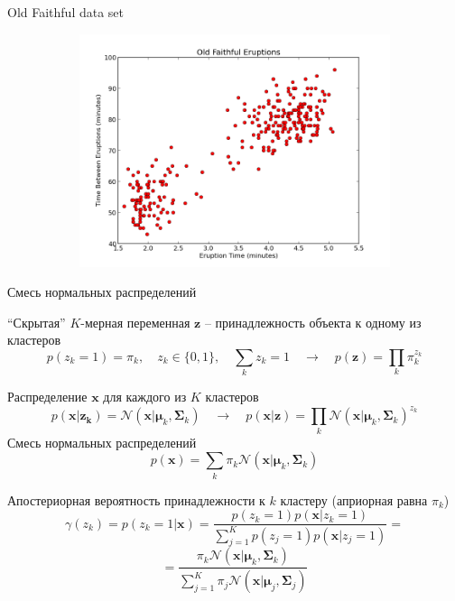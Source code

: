 \documentclass[10pt]{beamer}
\begin{document}
\begin{frame}{Old Faithful data set}
\begin{figure}
\begin{subfigure}[b]{0.6\textwidth}
                \includegraphics[width=\textwidth]{images/of2.png}
                \caption{}
        \end{subfigure}        
\end{figure}

\end{frame}

\begin{frame}{Смесь нормальных распределений}

``Скрытая'' $K$-мерная переменная $\mathbf{z}$ -- принадлежность объекта к одному из кластеров
\[
p(z_k = 1) = \pi_k, \quad z_k \in \{0, 1\}, \quad \sum_k z_k = 1 \quad\rightarrow\quad p(\mathbf{z}) = \prod_k \pi_k^{z_k}
\]

Распределение $\mathbf{x}$ для каждого из $K$ кластеров
\[
p(\mathbf{x} | \mathbf{z_k}) = \mathcal{N}(\mathbf{x} | \mathbf{\mu}_k, \mathbf{\Sigma}_k) \quad \rightarrow \quad p(\mathbf{x} | \mathbf{z}) = \prod_k \mathcal{N}(\mathbf{x} | \mathbf{\mu}_k, \mathbf{\Sigma}_k)^{z_k}
\]
Смесь нормальных распределений
\[
p(\mathbf{x}) = \sum_k \pi_k \mathcal{N}(\mathbf{x} | \mathbf{\mu}_k, \mathbf{\Sigma}_k)
\]

\end{frame}

\begin{frame}{}

Апостериорная вероятность принадлежности к $k$ кластеру (априорная равна $\pi_k$)
\[
\gamma(z_k) = p(z_k = 1 | \mathbf{x}) = \frac{p(z_k=1) p(\mathbf{x} | z_k = 1)}{\sum_{j=1}^K p(z_j=1) p(\mathbf{x} | z_j = 1)} =
\]
\[
= \frac{\pi_k \mathcal{N}(\mathbf{x} | \mathbf{\mu}_k, \mathbf{\Sigma}_k)}{\sum_{j=1}^K \pi_j \mathcal{N}(\mathbf{x} | \mathbf{\mu}_j, \mathbf{\Sigma}_j)}
\]

\end{frame}
\end{document}
